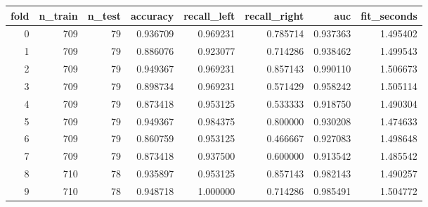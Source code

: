 \begin{tabular}{rrrrrrrr}
\toprule
fold & n_train & n_test & accuracy & recall_left & recall_right & auc & fit_seconds \\
\midrule
0 & 709 & 79 & 0.936709 & 0.969231 & 0.785714 & 0.937363 & 1.495402 \\
1 & 709 & 79 & 0.886076 & 0.923077 & 0.714286 & 0.938462 & 1.499543 \\
2 & 709 & 79 & 0.949367 & 0.969231 & 0.857143 & 0.990110 & 1.506673 \\
3 & 709 & 79 & 0.898734 & 0.969231 & 0.571429 & 0.958242 & 1.505114 \\
4 & 709 & 79 & 0.873418 & 0.953125 & 0.533333 & 0.918750 & 1.490304 \\
5 & 709 & 79 & 0.949367 & 0.984375 & 0.800000 & 0.930208 & 1.474633 \\
6 & 709 & 79 & 0.860759 & 0.953125 & 0.466667 & 0.927083 & 1.498648 \\
7 & 709 & 79 & 0.873418 & 0.937500 & 0.600000 & 0.913542 & 1.485542 \\
8 & 710 & 78 & 0.935897 & 0.953125 & 0.857143 & 0.982143 & 1.490257 \\
9 & 710 & 78 & 0.948718 & 1.000000 & 0.714286 & 0.985491 & 1.504772 \\
\bottomrule
\end{tabular}
